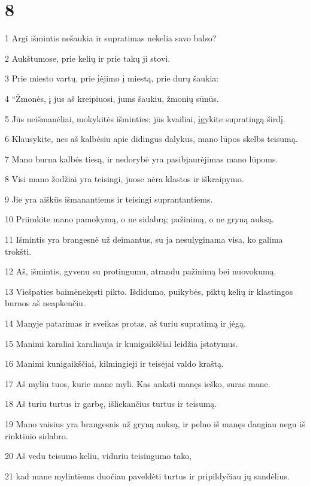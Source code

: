 \chapter{8}


\par 1 Argi išmintis nešaukia ir supratimas nekelia savo balso? 
\par 2 Aukštumose, prie kelių ir prie takų ji stovi. 
\par 3 Prie miesto vartų, prie įėjimo į miestą, prie durų šaukia: 
\par 4 “Žmonės, į jus aš kreipiuosi, jums šaukiu, žmonių sūnūs. 
\par 5 Jūs neišmanėliai, mokykitės išminties; jūs kvailiai, įgykite supratingą širdį. 
\par 6 Klausykite, nes aš kalbėsiu apie didingus dalykus, mano lūpos skelbs teisumą. 
\par 7 Mano burna kalbės tiesą, ir nedorybė yra pasibjaurėjimas mano lūpoms. 
\par 8 Visi mano žodžiai yra teisingi, juose nėra klastos ir iškraipymo. 
\par 9 Jie yra aiškūs išmanantiems ir teisingi suprantantiems. 
\par 10 Priimkite mano pamokymą, o ne sidabrą; pažinimą, o ne gryną auksą. 
\par 11 Išmintis yra brangesnė už deimantus, su ja nesulyginama visa, ko galima trokšti. 
\par 12 Aš, išmintis, gyvenu su protingumu, atrandu pažinimą bei nuovokumą. 
\par 13 Viešpaties baimė­nekęsti pikto. Išdidumo, puikybės, piktų kelių ir klastingos burnos aš neapkenčiu. 
\par 14 Manyje patarimas ir sveikas protas, aš turiu supratimą ir jėgą. 
\par 15 Manimi karaliai karaliauja ir kunigaikščiai leidžia įstatymus. 
\par 16 Manimi kunigaikščiai, kilmingieji ir teisėjai valdo kraštą. 
\par 17 Aš myliu tuos, kurie mane myli. Kas anksti manęs ieško, suras mane. 
\par 18 Aš turiu turtus ir garbę, išliekančius turtus ir teisumą. 
\par 19 Mano vaisius yra brangesnis už gryną auksą, ir pelno iš manęs daugiau negu iš rinktinio sidabro. 
\par 20 Aš vedu teisumo keliu, viduriu teisingumo tako, 
\par 21 kad mane mylintiems duočiau paveldėti turtus ir pripildyčiau jų sandėlius. 
